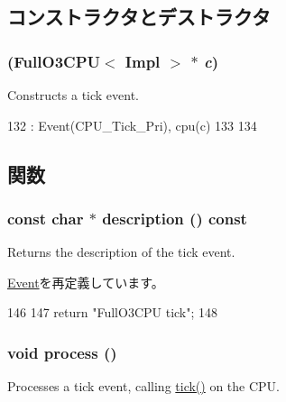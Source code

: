 \subsection{コンストラクタとデストラクタ}
\hypertarget{classFullO3CPU_1_1TickEvent_ac68e05215075fac41ae8e454d9dfd97a}{
\subsubsection[{TickEvent}]{ ({\bf FullO3CPU}$<$ Impl $>$ $\ast$ {\em c})}}
\label{classFullO3CPU_1_1TickEvent_ac68e05215075fac41ae8e454d9dfd97a}
Constructs a tick event. 


\begin{DoxyCode}
132     : Event(CPU_Tick_Pri), cpu(c)
133 {
134 }
\end{DoxyCode}


\subsection{関数}
\hypertarget{classFullO3CPU_1_1TickEvent_a5a14fe478e2393ff51f02e9b7be27e00}{
\subsubsection[{description}]{\setlength{\rightskip}{0pt plus 5cm}const char $\ast$ description () const}}
\label{classFullO3CPU_1_1TickEvent_a5a14fe478e2393ff51f02e9b7be27e00}
Returns the description of the tick event. 

\hyperlink{classEvent_a130ddddf003422b413e2e891b1b80e8f}{Event}を再定義しています。


\begin{DoxyCode}
146 {
147     return "FullO3CPU tick";
148 }
\end{DoxyCode}
\hypertarget{classFullO3CPU_1_1TickEvent_a2e9c5136d19b1a95fc427e0852deab5c}{
\subsubsection[{process}]{\setlength{\rightskip}{0pt plus 5cm}void process ()}}
\label{classFullO3CPU_1_1TickEvent_a2e9c5136d19b1a95fc427e0852deab5c}
Processes a tick event, calling \hyperlink{classFullO3CPU_a873dd91783f9efb4a590aded1f70d6b0}{tick()} on the CPU. 

